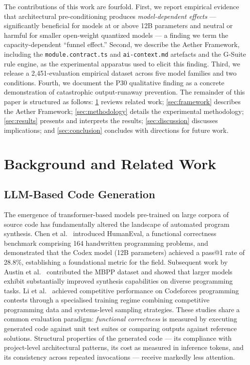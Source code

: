 \documentclass[review,12pt,3p]{elsarticle}
\begin{document}
The contributions of this work are fourfold. First, we report empirical evidence that
architectural pre-conditioning produces \emph{model-dependent effects} --- significantly
beneficial for models at or above 12B parameters and neutral or harmful for smaller
open-weight quantized models --- a finding we term the capacity-dependent ``funnel
effect.'' Second, we describe the Aether Framework, including the
\texttt{module.contract.ts} and \texttt{ai-context.md} artefacts and the G-Suite rule
engine, as the experimental apparatus used to elicit this finding. Third, we release a
2,451-evaluation empirical dataset across five model families and two conditions. Fourth,
we document the P30 qualitative finding as a concrete demonstration of catastrophic
output-runaway prevention. The remainder of this paper is structured as follows:
\cref{sec:background} reviews related work; \cref{sec:framework} describes the Aether
Framework; \cref{sec:methodology} details the experimental methodology;
\cref{sec:results} presents and interprets the results; \cref{sec:discussion} discusses
implications; and \cref{sec:conclusion} concludes with directions for future work.

\section{Background and Related Work}
\label{sec:background}

\subsection{LLM-Based Code Generation}

The emergence of transformer-based models pre-trained on large corpora of source code has
fundamentally altered the landscape of automated program synthesis. Chen et
al.~\citep{Chen2021HumanEval} introduced HumanEval, a functional correctness benchmark
comprising 164 handwritten programming problems, and demonstrated that the Codex model
(12B parameters) achieved a pass@1 rate of 28.8\%, establishing a foundational metric for
the field. Subsequent work by Austin et al.~\citep{Austin2021MBPP} contributed the MBPP
dataset and showed that larger models exhibit substantially improved synthesis capabilities
on diverse programming tasks. Li et al.~\citep{Li2022AlphaCode} achieved competitive
performance on Codeforces programming contests through a specialised training regime
combining competitive programming data and systems-level sampling strategies. These studies
share a common evaluation paradigm: \emph{functional correctness} is measured by executing
generated code against unit test suites or comparing outputs against reference solutions.
Structural properties of the generated code --- its compliance with project-level
architectural patterns, its cost as measured in inference tokens, and its consistency across
repeated invocations --- receive markedly less attention.
\end{document}
